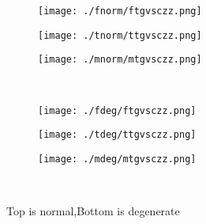 \documentclass[aps,floats,floatfix,nofootinbib]{revtex4-1}
\begin{document}
\begin{center}
\begin{figure}
\begin{subfigure}{0.3\textwidth}
\texttt{[image: ./fnorm/ftgvsczz.png]}
\label{}
\end{subfigure}
\begin{subfigure}{0.3\textwidth}
\texttt{[image: ./tnorm/ttgvsczz.png]}
\label{}
\end{subfigure}
\begin{subfigure}{0.3\textwidth}
\texttt{[image: ./mnorm/mtgvsczz.png]}
\label{}
\end{subfigure}\\
\begin{subfigure}{0.3\textwidth}
\texttt{[image: ./fdeg/ftgvsczz.png]}
\label{}
\end{subfigure}
\begin{subfigure}{0.3\textwidth}
\texttt{[image: ./tdeg/ttgvsczz.png]}
\label{}
\end{subfigure}
\begin{subfigure}{0.3\textwidth}
\texttt{[image: ./mdeg/mtgvsczz.png]}
\label{}
\end{subfigure}\\
\caption{Top is normal,Bottom is degenerate}
\end{figure}
\end{center}
\end{document}
